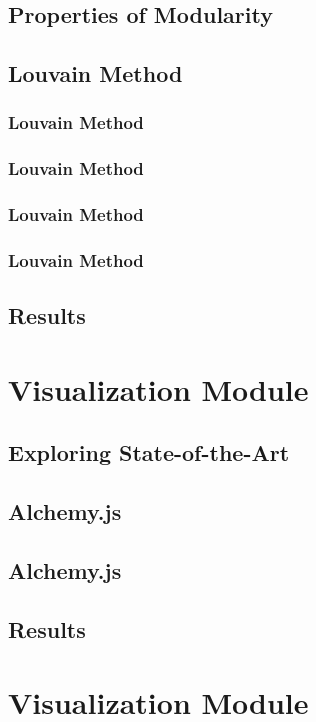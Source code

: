\documentclass{beamer}
\begin{document}
\subsection{Properties of Modularity}

\subsection{Louvain Method} \frame{}
\subsubsection[Phase1]{Louvain Method} \frame{}
\subsubsection[Phase2]{Louvain Method} \frame{}
\subsubsection[Observations]{Louvain Method} \frame{}
\subsubsection[Experiments]{Louvain Method} \frame{}
\subsection{Results} \frame{}


\section{Visualization Module}
\subsection{Exploring State-of-the-Art} \frame{}
\subsection{Alchemy.js} \frame{}
\subsection[Experiments]{Alchemy.js} \frame{}
\subsection{Results} \frame{}

\section{Visualization Module}
\end{document}
